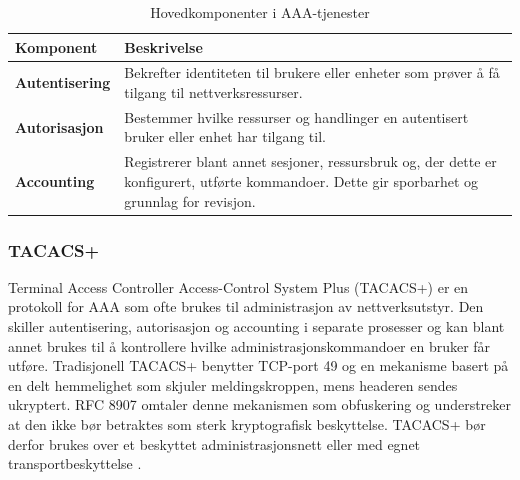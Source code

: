 \begin{table}[H]

\centering

\caption{Hovedkomponenter i AAA-tjenester}

\label{tab:aaa-komponenter}

\small

\renewcommand{\arraystretch}{1.25}

\begin{tabular}{@{}ll@{}}

\toprule

\parbox[t]{0.2\textwidth}{\textbf{Komponent}} & \parbox[t]{0.6\textwidth}{\textbf{Beskrivelse}} \\

\midrule

\parbox[t]{0.2\textwidth}{\footnotesize\textbf{Autentisering}} & \parbox[t]{0.6\textwidth}{\raggedright Bekrefter identiteten til brukere eller enheter som prøver å få tilgang til nettverksressurser.} \\

\addlinespace

\parbox[t]{0.2\textwidth}{\footnotesize\textbf{Autorisasjon}} & \parbox[t]{0.6\textwidth}{\raggedright Bestemmer hvilke ressurser og handlinger en autentisert bruker eller enhet har tilgang til.} \\

\addlinespace

\parbox[t]{0.2\textwidth}{\footnotesize\textbf{Accounting}} & \parbox[t]{0.6\textwidth}{\raggedright Registrerer blant annet sesjoner, ressursbruk og, der dette er konfigurert, utførte kommandoer. Dette gir sporbarhet og grunnlag for revisjon.} \\

\bottomrule

\end{tabular}

\end{table}

\subsubsection{TACACS+}

Terminal Access Controller Access-Control System Plus (TACACS+) er en protokoll for AAA som ofte brukes til administrasjon av nettverksutstyr. Den skiller autentisering, autorisasjon og accounting i separate prosesser og kan blant annet brukes til å kontrollere hvilke administrasjonskommandoer en bruker får utføre. Tradisjonell TACACS+ benytter TCP-port 49 og en mekanisme basert på en delt hemmelighet som skjuler meldingskroppen, mens headeren sendes ukryptert. RFC 8907 omtaler denne mekanismen som obfuskering og understreker at den ikke bør betraktes som sterk kryptografisk beskyttelse. TACACS+ bør derfor brukes over et beskyttet administrasjonsnett eller med egnet transportbeskyttelse \cite{rfc8907}.

